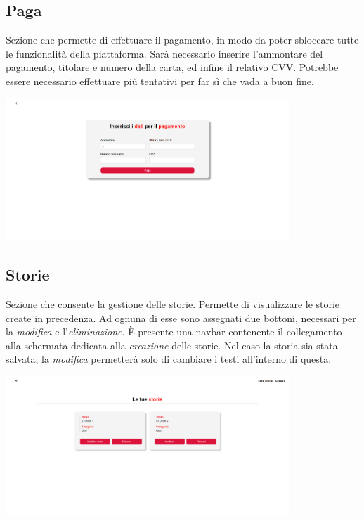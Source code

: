 \documentclass{article}
\begin{document}
\subsection*{Paga}
Sezione che permette di effettuare il pagamento, in modo da poter sbloccare tutte le funzionalità della piattaforma. Sarà necessario inserire l'ammontare del pagamento, titolare e numero della carta, ed infine il relativo CVV. Potrebbe essere necessario effettuare più tentativi per far sì che vada a buon fine.
\begin{center}
    \includegraphics[width=0.8\textwidth]{foto8.png}
\end{center}

\subsection*{Storie}
Sezione che consente la gestione delle storie. Permette di visualizzare le storie create in precedenza. Ad ognuna di esse sono assegnati due bottoni, necessari per la \textit{modifica} e l'\textit{eliminazione}. È presente una navbar contenente il collegamento alla schermata dedicata alla \textit{creazione} delle storie. Nel caso la storia sia stata salvata, la \textit{modifica} permetterà solo di cambiare i testi all'interno di questa.
\begin{center}
    \includegraphics[width=0.8\textwidth]{foto9.png}
\end{center}
\end{document}

